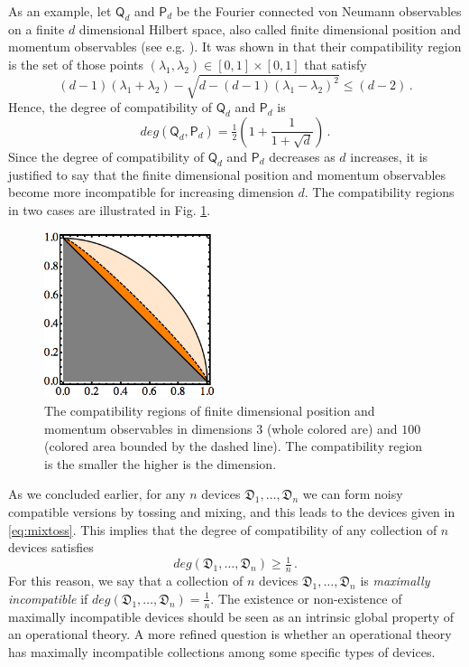 \documentclass[12pt]{article}
\theoremstyle{definition}
\newcommand{\half}{\tfrac{1}{2}} %
\newcommand{\Po}{\mathsf{P}}%
\newcommand{\Qo}{\mathsf{Q}}%
\newcommand{\Dev}{\mathfrak{D}} %
\begin{document}
As an example, let $\Qo_d$ and $\Po_d$ be the Fourier connected von Neumann observables on a finite $d$ dimensional Hilbert space, also called  finite dimensional position and momentum observables (see e.g. \cite{Vourdas97}).
It was shown in \cite{CaHeTo12} that their compatibility region is the set of those points $(\lambda_1,\lambda_2)\in [0,1]\times[0,1]$ that satisfy
\begin{equation}\label{eq:lambda}
(d-1) (\lambda_1 + \lambda_2) -  \sqrt{d  - (d-1) (\lambda_1 - \lambda_2)^2}\leq (d-2) \, .
\end{equation}
Hence, the degree of compatibility of $\Qo_d$ and $\Po_d$ is
\begin{equation}\label{eq:pos-mom}
deg(\Qo_d,\Po_d) = \half \left( 1 + \frac{1}{1+\sqrt{d}} \right) \, .
\end{equation}
Since the degree of compatibility of $\Qo_d$ and $\Po_d$ decreases as $d$ increases, it is justified to say that the finite dimensional position and momentum observables become more incompatible for increasing dimension $d$.
The compatibility regions in two cases are illustrated in Fig. \ref{fig:dim}.

\begin{figure}\begin{center}
\includegraphics[width=5cm]{fig_regiondim.png}
\caption{The compatibility regions of finite dimensional position and momentum observables in dimensions $3$ (whole colored are) and $100$ (colored area bounded by the dashed line).
The compatibility region is the smaller the higher is the dimension.}
\label{fig:dim}
\end{center}
\end{figure}
 
As we concluded earlier, for any $n$ devices $\Dev_1,\ldots,\Dev_n$ we can form noisy compatible versions by tossing and mixing, and this leads to the devices given in \eqref{eq:mixtoss}.
This implies that the degree of compatibility of any collection of $n$ devices satisfies 
\begin{equation}
deg(\Dev_1,\ldots,\Dev_n) \geq \tfrac{1}{n} \, .
\end{equation}
For this reason, we say that a collection of $n$ devices $\Dev_1,\ldots,\Dev_n$ is \emph{maximally incompatible} if $deg(\Dev_1,\ldots,\Dev_n) = \tfrac{1}{n}$. 
The existence or non-existence of maximally incompatible devices should be seen as an intrinsic global property of an operational theory. 
A more refined question is whether an operational theory has maximally incompatible collections among some specific types of devices. 
\end{document}
